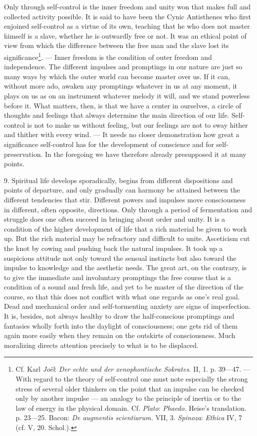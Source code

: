 \documentclass[12pt,a4paper,openany]{book}
\newcommand{\opage}[1]{\marginnote{\footnotesize\textit{[#1]}}}
\begin{document}
Only through self-control is the inner freedom and unity won that makes full and collected activity possible. It is
said to have been the Cynic Antisthenes who first enjoined self-control as a virtue of its own, teaching that he
who does not master himself is a slave, whether he is outwardly free or not. It was an ethical point of view from
which the difference between the free man and the slave lost its significance\footnote[1]{Cf. Karl \emph{Joël}:
\textit{Der echte und der xenophontische Sokrates.} II, 1. p. 39---47. --- With regard to the theory of
self-control one must note especially the strong stress of several older thinkers on the point that an impulse can
be checked only by another impulse --- an analogy to the principle of inertia or to the law of energy in the
physical domain. Cf. \emph{Plato}: \textit{Phaedo.} Heise's translation. p. 23---25. Bacon: \textit{De augmentis
scientiarum.} VII, 3. \emph{Spinoza}: \textit{Ethica} IV, 7 (cf. V, 20. Schol.).}. --- Inner freedom is the
condition of outer freedom and independence. The different impulses and promptings in our nature are just so many
ways by which the outer world can become master over us. If it can, without more ado, awaken any promptings whatever
in us at any moment, it plays on us as on an instrument whatever melody it will, and we stand powerless before it.
What matters, then, is that we have a center in ourselves, a circle of thoughts and feelings that always determine
the main direction of our life. Self-control is not to make us without feeling, but our feelings are not to sway
hither and thither with every wind. --- It needs no closer demonstration how great a significance self-control has
for the development of conscience and for self-preservation. In the foregoing we have therefore already presupposed
it at many points.

9. Spiritual life develops sporadically, begins from different dispositions and points of departure, and only
gradually can harmony be attained between the different tendencies that stir. Different powers and impulses move
consciousness in different, often opposite, directions. Only through a period of fermentation and struggle does one
often succeed in bringing about order and unity. It is a condition of the higher development of life that
\opage{222}a rich material be given to work up. But the rich material may be refractory and difficult to unite.
Asceticism cut the knot by cowing and pushing back the natural impulses. It took up a suspicious attitude not only
toward the sensual instincts but also toward the impulse to knowledge and the aesthetic needs. The great art, on
the contrary, is to give the immediate and involuntary promptings the free course that is a condition of a sound
and fresh life, and yet to be master of the direction of the course, so that this does not conflict with what one
regards as one's real goal. Dead and mechanical order and self-tormenting anxiety are signs of imperfection. It is,
besides, not always healthy to draw the half-conscious promptings and fantasies wholly forth into the daylight of
consciousness; one gets rid of them again more easily when they remain on the outskirts of consciousness. Much
moralizing directs attention precisely to what is to be displaced.
\end{document}
